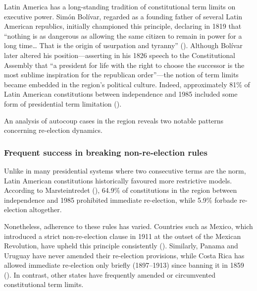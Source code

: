 \documentclass[
  12pt,
]{report}
\begin{document}
Latin America has a long-standing tradition of constitutional term
limits on executive power. Simón Bolívar, regarded as a founding father
of several Latin American republics, initially championed this
principle, declaring in 1819 that ``nothing is as dangerous as allowing
the same citizen to remain in power for a long time\ldots{} That is the
origin of usurpation and tyranny'' (). Although Bolívar later altered his
position---asserting in his 1826 speech to the Constitutional Assembly
that ``a president for life with the right to choose the successor is
the most sublime inspiration for the republican order''---the notion of
term limits became embedded in the region's political culture. Indeed,
approximately 81\% of Latin American constitutions between independence
and 1985 included some form of presidential term limitation
().

An analysis of autocoup cases in the region reveals two notable patterns
concerning re-election dynamics.

\subsubsection*{Frequent success in breaking non-re-election
rules}\label{frequent-success-in-breaking-non-re-election-rules}

Unlike in many presidential systems where two consecutive terms are the
norm, Latin American constitutions historically favoured more
restrictive models. According to Marsteintredet
(), 64.9\% of constitutions in
the region between independence and 1985 prohibited immediate
re-election, while 5.9\% forbade re-election altogether.

Nonetheless, adherence to these rules has varied. Countries such as
Mexico, which introduced a strict non-re-election clause in 1911 at the
outset of the Mexican Revolution, have upheld this principle
consistently (). Similarly,
Panama and Uruguay have never amended their re-election provisions,
while Costa Rica has allowed immediate re-election only briefly
(1897--1913) since banning it in 1859
(). In contrast,
other states have frequently amended or circumvented constitutional term
limits.
\end{document}
